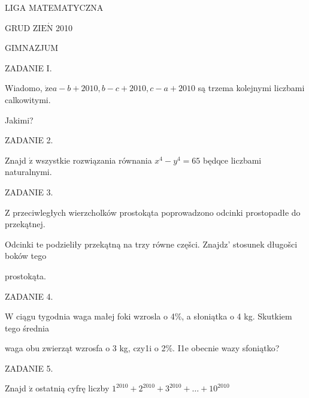 \documentclass[a4paper,12pt]{article}
\begin{document}
LIGA MATEMATYCZNA

GRUD Z$\mathrm{I}\mathrm{E}\acute{\mathrm{N}}$ 2010

GIMNAZJUM

ZADANIE I.

Wiadomo, $\dot{\mathrm{z}}\mathrm{e}a-b+2010, b-c+2010, c-a+2010$ są trzema kolejnymi liczbami calkowitymi.

Jakimi?

ZADANIE 2.

Znajd $\acute{\mathrm{z}}$ wszystkie rozwiązania równania $x^{4}-y^{4}=65$ będqce liczbami naturalnymi.

ZADANIE 3.

Z przeciwległych wierzcholków prostokąta poprowadzono odcinki prostopadłe do przekątnej.

Odcinki te podzieliły przekątną na trzy równe częšci. Znajdz' stosunek długošci boków tego

prostokąta.

ZADANIE 4.

W ciągu tygodnia waga małej foki wzrosla o 4\%, a słoniątka o 4 kg. Skutkiem tego średnia

waga obu zwierząt wzrosfa o 3 kg, czy1i o 2\%. I1e obecnie wazy sfoniątko?

ZADANIE 5.

Znajd $\acute{\mathrm{z}}$ ostatnią cyfrę liczby $1^{2010}+2^{2010}+3^{2010}+\ldots+10^{2010}$
\end{document}
